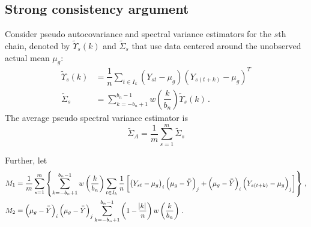 \documentclass[11pt]{article}
\newcommand{\E}{\mathbb{E}}
\newcommand{\Var}{\text{Var}}
\theoremstyle{remark}
\begin{document}



\subsection{Strong consistency argument} \label{appendix:strong_consis}


Consider pseudo autocovariance and spectral variance estimators for the $s$th chain, denoted by $\tilde{\Upsilon}_s(k)$ and $\tilde{\Sigma}_s$ that use data centered around the unobserved actual mean $\mu_g$:
\begin{align*}
    \tilde{\Upsilon}_s(k) &= \dfrac{1}{n}\sum_{t \in I_k}(Y_{st}-\mu_g)(Y_{s(t+k)}-\mu_g)^T \\ 
    \tilde{\Sigma}_s &= \sum_{k=-b_n+1}^{b_n-1}w\left(\dfrac{k}{b_n}\right)\tilde{\Upsilon}_s(k) \,.
\end{align*}
%
The average pseudo spectral variance estimator is
\[
\tilde{\Sigma}_A = \dfrac{1}{m}\sum\limits_{s=1}^{m}\tilde{\Sigma}_s
\]

Further, let
\begin{align*}
  M_1 & = \dfrac{1}{m}\sum\limits_{s=1}^{m}\left\{\sum\limits_{k=-b_n+1}^{b_n-1}w\left(\dfrac{k}{b_n}\right)\sum\limits_{t \in I_k}\dfrac{1}{n}\left[ \left(Y_{st}-\mu_g \right)_i   \left(\mu_g-\bar{\bar{Y}} \right)_j +    \left(\mu_g-\bar{\bar{Y}} \right)_i  \left(Y_{s(t+k)}-\mu_g \right)_j \right]\right\}\,, \\ 
M_2 &= \left(\mu_g-\bar{\bar{Y}} \right)_i   \left(\mu_g-\bar{\bar{Y}} \right)_j\sum\limits_{k=-b_n+1}^{b_n-1}\left(1-\dfrac{\abs{k}}{n}\right)w\left(\dfrac{k}{b_n}\right)\,.
\end{align*}
\end{document}
